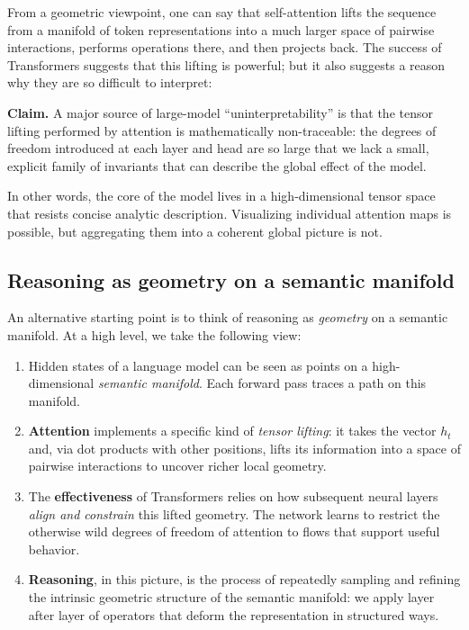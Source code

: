 \documentclass[11pt]{article}
\begin{document}
From a geometric viewpoint, one can say that self-attention lifts the sequence from a manifold of token representations into a much larger space of pairwise interactions, performs operations there, and then projects back. The success of Transformers suggests that this lifting is powerful; but it also suggests a reason why they are so difficult to interpret:

\medskip
\noindent\textbf{Claim.} A major source of large-model ``uninterpretability'' is that the tensor lifting performed by attention is mathematically non-traceable: the degrees of freedom introduced at each layer and head are so large that we lack a small, explicit family of invariants that can describe the global effect of the model.
\medskip

In other words, the core of the model lives in a high-dimensional tensor space that resists concise analytic description. Visualizing individual attention maps is possible, but aggregating them into a coherent global picture is not.

\subsection{Reasoning as geometry on a semantic manifold}

An alternative starting point is to think of reasoning as \emph{geometry} on a semantic manifold. At a high level, we take the following view:

\begin{enumerate}
    \item Hidden states of a language model can be seen as points on a high-dimensional \emph{semantic manifold}. Each forward pass traces a path on this manifold.
    \item \textbf{Attention} implements a specific kind of \emph{tensor lifting}: it takes the vector $h_t$ and, via dot products with other positions, lifts its information into a space of pairwise interactions to uncover richer local geometry.
    \item The \textbf{effectiveness} of Transformers relies on how subsequent neural layers \emph{align and constrain} this lifted geometry. The network learns to restrict the otherwise wild degrees of freedom of attention to flows that support useful behavior.
    \item \textbf{Reasoning}, in this picture, is the process of repeatedly sampling and refining the intrinsic geometric structure of the semantic manifold: we apply layer after layer of operators that deform the representation in structured ways.
\end{enumerate}
\end{document}
